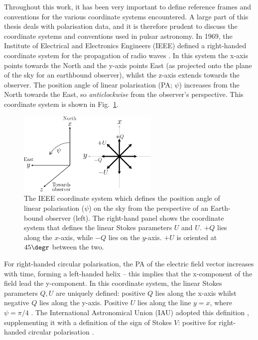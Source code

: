 Throughout this work, it has been very important to define reference frames and conventions for the various coordinate systems encountered. A large part of this thesis deals with polarisation data, and it is therefore prudent to discuss the coordinate systems and conventions used in pulsar astronomy. In 1969, the Institute of Electrical and Electronics Engineers (IEEE) defined a right-handed coordinate system for the propagation of radio waves \citep[][still valid as of 2019]{IEEE1969}. In this system the x-axis points towards the North and the y-axis points East (as projected onto the plane of the sky for an earthbound observer), whilst the z-axis extends towards the observer. The position angle of linear polarisation (PA; $\psi$) increases from the North towards the East, so \textit{anticlockwise} from the observer's perspective. This coordinate system is shown in Fig.~\ref{fig: intro - IEEE polarisation frame}.
\begin{figure}
    \begin{center}
        \includegraphics[width=0.6\textwidth]{Figures/Introduction/IEEE_coordinate_system}
        \caption[Reference frame of IEEE polarisation conventions]{The IEEE coordinate system which defines the position angle of linear polarisation ($\psi$) on the sky from the perspective of an Earth-bound observer (left). The right-hand panel shows the coordinate system that defines the linear Stokes parameters $U$ and $U$. $+Q$ lies along the $x$-axis, while $-Q$ lies on the $y$-axis. $+U$ is oriented at $45\degr$ between the two. }
        \label{fig: intro - IEEE polarisation frame}
    \end{center}
\end{figure}
For right-handed circular polarisation, the PA of the electric field vector increases with time, forming a left-handed helix -- this implies that the x-component of the field lead the y-component. In this coordinate system, the linear Stokes parameters $Q,U$ are uniquely defined: positive $Q$ lies along the x-axis whilst negative $Q$ lies along the y-axis. Positive $U$ lies along the line $y=x$, where $\psi=\pi / 4$ \citep{HBxx1996}. The International Astronomical Union (IAU) adopted this definition \citep{IAU1974}, supplementing it with a definition of the sign of Stokes $V$: positive for right-handed circular polarisation \citep{Wxxx1973,TMSx1986}.

